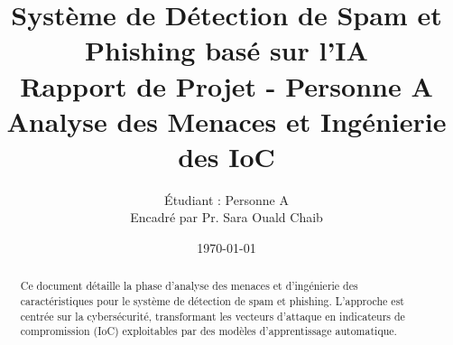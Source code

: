 \documentclass[12pt,a4paper]{article}
\title{
    \textbf{Système de Détection de Spam et Phishing basé sur l'IA} \\
    \vspace{0.5cm}
    \large Rapport de Projet - Personne A \\
    \small Analyse des Menaces et Ingénierie des IoC
}
\author{Étudiant : Personne A \\ \small Encadré par Pr. Sara Ouald Chaib}
\date{\today}
\begin{document}
\maketitle

\begin{abstract}
Ce document détaille la phase d'analyse des menaces et d'ingénierie des caractéristiques pour le système de détection de spam et phishing. L'approche est centrée sur la cybersécurité, transformant les vecteurs d'attaque en indicateurs de compromission (IoC) exploitables par des modèles d'apprentissage automatique.
\end{abstract}

\tableofcontents
\newpage


\end{document}
